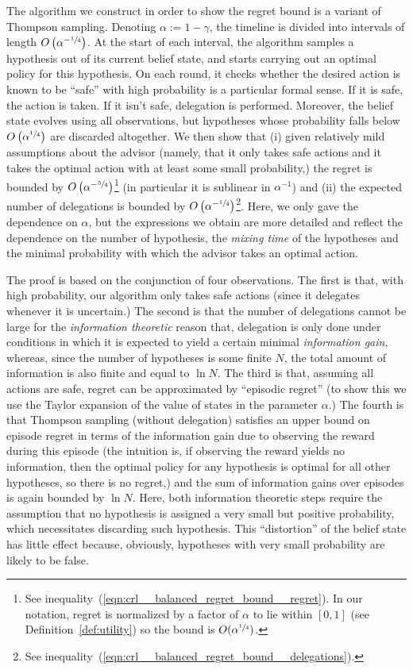 \documentclass[anon,12pt]{colt2018} %
\newcommand{\AP}[1]{\left(#1\right)}
\begin{document}
The algorithm we construct in order to show the regret bound is a variant of Thompson sampling. Denoting $\alpha:=1-\gamma$, the timeline is divided into intervals of length $O\AP{\alpha^{-\sfrac{1}{4}}}$. At the start of each interval, the algorithm samples a hypothesis out of its current belief state, and starts carrying out an optimal policy for this hypothesis. On each round, it checks whether the desired action is known to be \enquote{safe} with high probability is a particular formal sense. If it is safe, the action is taken. If it isn't safe, delegation is performed. Moreover, the belief state evolves using all observations, but hypotheses whose probability falls below $O\AP{\alpha^{\sfrac{1}{4}}}$ are discarded altogether. We then show that (i) given relatively mild assumptions about the advisor (namely, that it only takes safe actions and it takes the optimal action with at least some small probability,) the regret is bounded by $O\AP{\alpha^{-\sfrac{3}{4}}}$\footnote{See inequality~(\ref{eqn:crl__balanced_regret_bound__regret}). In our notation, regret is normalized by a factor of $\alpha$ to lie within $[0,1]$ (see Definition~\ref{def:utility}) so the bound is $O(\alpha^{\sfrac{1}{4}})$.} (in particular it is sublinear in $\alpha^{-1}$) and (ii) the expected number of delegations is bounded by $O\AP{\alpha^{-\sfrac{1}{4}}}$\footnote{See inequality~(\ref{eqn:crl__balanced_regret_bound__delegations}).}. Here, we only gave the dependence on $\alpha$, but the expressions we obtain are more detailed and reflect the dependence on the number of hypothesis, the \emph{mixing time} of the hypotheses and the minimal probability with which the advisor takes an optimal action.

The proof is based on the conjunction of four observations. The first is that, with high probability, our algorithm only takes safe actions (since it delegates whenever it is uncertain.) The second is that the number of delegations cannot be large for the \emph{information theoretic} reason that, delegation is only done under conditions in which it is expected to yield a certain minimal \emph{information gain}, whereas, since the number of hypotheses is some finite $N$, the total amount of information is also finite and equal to $\ln N$. The third is that, assuming all actions are safe, regret can be approximated by \enquote{episodic regret} (to show this we use the Taylor expansion of the value of states in the parameter $\alpha$.) The fourth is that Thompson sampling (without delegation) satisfies an upper bound on episode regret in terms of the information gain due to observing the reward during this episode (the intuition is, if observing the reward yields no information, then the optimal policy for any hypothesis is optimal for all other hypotheses, so there is no regret,) and the sum of information gains over episodes is again bounded by $\ln N$. Here, both information theoretic steps require the assumption that no hypothesis is assigned a very small but positive probability, which necessitates discarding such hypothesis. This \enquote{distortion} of the belief state has little effect because, obviously, hypotheses with very small probability are likely to be false.
\end{document}
